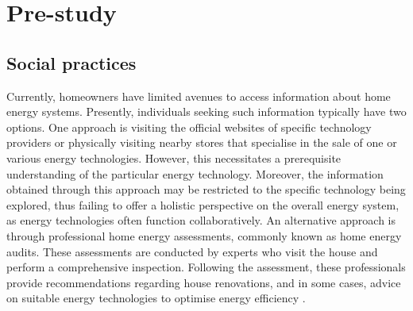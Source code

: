 \chapter{Pre-study} 





\section{Social practices}

Currently, homeowners have limited avenues to access information about home energy systems. 
Presently, individuals seeking such information typically have two options. 
One approach is visiting the official websites of specific technology providers or physically visiting nearby stores that specialise in the sale of one or various energy technologies. 
However, this necessitates a prerequisite understanding of the particular energy technology.
Moreover, the information obtained through this approach may be restricted to the specific technology being explored, thus failing to offer a holistic perspective on the overall energy system, as energy technologies often function collaboratively.
An alternative approach is through professional home energy assessments, commonly known as home energy audits.
These assessments are conducted by experts who visit the house and perform a comprehensive inspection.
Following the assessment, these professionals provide recommendations regarding house renovations, and in some cases, advice on suitable energy technologies to optimise energy efficiency \cite{professionalhea}.


